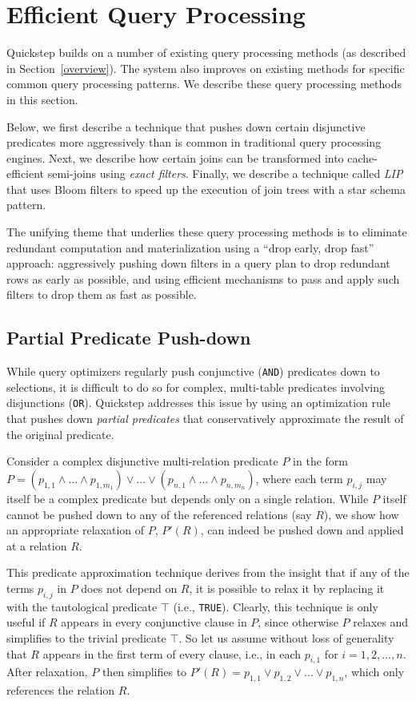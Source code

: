 \section{Efficient Query Processing} \label{sec:query-opt}
Quickstep builds on a number of existing query processing methods (as described in Section~\ref{overview}). The system also improves on existing methods for specific common query processing patterns. We describe these query processing methods in this section.

Below, we first describe a technique that pushes down certain disjunctive predicates more aggressively than is common in traditional query processing engines. Next, we describe how certain joins can be transformed into cache-efficient semi-joins using \textit{exact filters}. Finally, we describe a technique called \textit{LIP} that uses Bloom filters to speed up the execution of join trees with a star schema pattern.

The unifying theme that underlies these query processing methods is to eliminate redundant computation and materialization using a ``drop early, drop fast'' approach: aggressively pushing down filters in a query plan to drop redundant rows as early as possible, and using efficient mechanisms to pass and apply such filters to drop them as fast as possible.

\subsection{Partial Predicate Push-down}
\label{sec-pushdown-disj-preds}
While query optimizers regularly push conjunctive (\texttt{AND}) predicates down to selections, it is difficult to do so for complex, multi-table predicates involving disjunctions (\texttt{OR}). Quickstep addresses this issue by using an optimization rule that pushes down \textit{partial predicates} that conservatively approximate the result of the original predicate.

Consider a complex disjunctive multi-relation predicate $P$ in the form $P = (p_{1,1} \wedge \dots \wedge p_{1, m_1}) \vee \dots \vee (p_{n,1} \wedge \dots \wedge p_{n, m_n})$, where each term $p_{i,j}$ may itself be a complex predicate but depends only on a single relation. While $P$ itself cannot be pushed down to any of the referenced relations (say $R$), we show how an appropriate relaxation of $P$, $P'(R)$, can indeed be pushed down and applied at a relation $R$.

This predicate approximation technique derives from the insight that if any of the terms $p_{i,j}$ in $P$ does not depend on $R$, it is possible to relax it by replacing it with the tautological predicate $\top$ (i.e., \texttt{TRUE}). Clearly, this technique is only useful if $R$ appears in every conjunctive clause in $P$, since otherwise $P$ relaxes and simplifies to the trivial predicate $\top$. So let us assume without loss of generality that $R$ appears in the first term of every clause, i.e., in each $p_{i,1}$ for $i = 1,2,\ldots,n$. After relaxation, $P$ then simplifies to $P'(R) = p_{1,1} \vee p_{1,2} \vee \ldots \vee p_{1,n}$, which only references the relation $R$.

